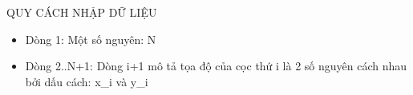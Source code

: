 QUY CÁCH NHẬP DỮ LIỆU  
\begin{itemize}
	\item     Dòng 1: Một số nguyên: N   
	\item     Dòng 2..N+1: Dòng i+1 mô tả tọa độ của cọc thứ i là 2 số nguyên         cách nhau bởi dấu cách: x\_i và y\_i   
\end{itemize}